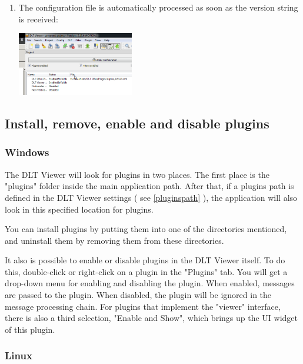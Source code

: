 \documentclass[a4paper,11pt]{article}
\begin{document}
\begin{enumerate}
\item The configuration file is automatically processed as soon as the version string is received:

\vspace{0.3cm}

\includegraphics[width=0.4\textwidth]{images/pluginsautoloadprocessed.png}

\end{enumerate}

\subsection{Install, remove, enable and disable plugins}
\label{installremoveplugins}

\subsubsection{Windows}
The DLT Viewer will look for plugins in two places. The first place is the
"plugins" folder inside the main application path. After that, if a plugins path is
defined in the DLT Viewer settings ( see \autoref{pluginspath} ), the application will also look in this specified location for plugins.

You can install plugins by putting them into one of the directories mentioned,
and uninstall them by removing them from these directories.

It also is possible to enable or disable plugins in the DLT Viewer itself.
To do this, double-click or right-click on a plugin in the "Plugins" tab. You will get a
drop-down menu for enabling and disabling the plugin. When enabled,
messages are passed to the plugin. When disabled, the plugin will be ignored in
the message processing chain. For plugins that implement the "viewer" interface,
there is also a third selection, "Enable and Show", which brings up the UI widget of
this plugin.

\subsubsection{Linux}
\end{document}
